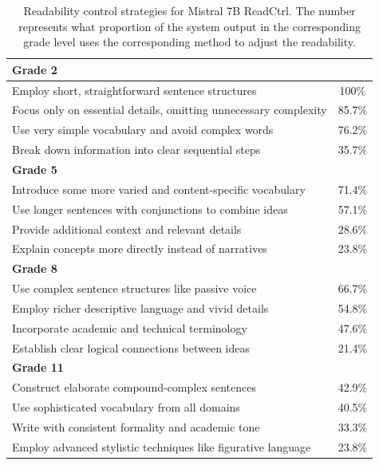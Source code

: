 \documentclass[11pt]{article}
\begin{document}
\begin{table}
\vspace{-6mm}
\scriptsize
\begin{tabular}{p{6.2cm}c}
\hline
\textbf{Grade 2}  & 
\\ \hline
Employ short, straightforward sentence structures  & 100\% 
\\ \hline
Focus only on essential details, omitting unnecessary complexity  & 85.7\% 
\\ \hline
Use very simple vocabulary and avoid complex words & 76.2\% 
\\ \hline
Break down information into clear sequential steps & 35.7\% 
\\ \hline

\textbf{Grade 5}  & 
\\ \hline
Introduce some more varied and content-specific vocabulary  & 71.4\% 
\\ \hline
Use longer sentences with conjunctions to combine ideas  & 57.1\% 
\\ \hline
Provide additional context and relevant details & 28.6\% 
\\ \hline
Explain concepts more directly instead of narratives & 23.8\% 
\\ \hline

\textbf{Grade 8}  & 
\\ \hline
Use complex sentence structures like passive voice  & 66.7\% 
\\ \hline
Employ richer descriptive language and vivid details  & 54.8\% 
\\ \hline
Incorporate academic and technical terminology & 47.6\% 
\\ \hline
Establish clear logical connections between ideas & 21.4\% 
\\ \hline

\textbf{Grade 11}  & 
\\ \hline
Construct elaborate compound-complex sentences  & 42.9\% 
\\ \hline
Use sophisticated vocabulary from all domains  & 40.5\% 
\\ \hline
Write with consistent formality and academic tone & 33.3\% 
\\ \hline
Employ advanced stylistic techniques like figurative language & 23.8\%
\\ \hline

\end{tabular}
\vspace{-2mm}
\caption{Readability control strategies for Mistral 7B ReadCtrl. The number represents what proportion of the system output in the corresponding grade level uses the corresponding method to adjust the readability.}
\label{tab:control_strategy}
\vspace{-4mm}
\end{table}
\end{document}
